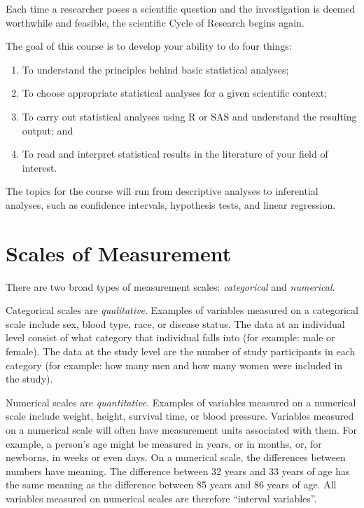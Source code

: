 \documentclass[
]{book}
\providecommand{\tightlist}{%
  \setlength{\itemsep}{0pt}\setlength{\parskip}{0pt}}
\begin{document}
Each time a researcher poses a scientific question and the investigation is deemed worthwhile and feasible, the scientific Cycle of Research begins again.

The goal of this course is to develop your ability to do four things:

\begin{enumerate}
\def\labelenumi{\arabic{enumi}.}
\tightlist
\item
  To understand the principles behind basic statistical analyses;
\item
  To choose appropriate statistical analyses for a given scientific context;
\item
  To carry out statistical analyses using R or SAS and understand the resulting output; and
\item
  To read and interpret statistical results in the literature of your field of interest.
\end{enumerate}

The topics for the course will run from descriptive analyses to inferential analyses, such as confidence intervals, hypothesis tests, and linear regression.

\hypertarget{scales-of-measurement}{%
\section{Scales of Measurement}\label{scales-of-measurement}}

There are two broad types of measurement scales: \emph{categorical} and \emph{numerical}.

Categorical scales are \emph{qualitative}. Examples of variables measured on a categorical scale include sex, blood type, race, or disease status. The data at an individual level consist of what category that individual falls into (for example: male or female). The data at the study level are the number of study participants in each category (for example: how many men and how many women were included in the study).

Numerical scales are \emph{quantitative}. Examples of variables measured on a numerical scale include weight, height, survival time, or blood pressure. Variables measured on a numerical scale will often have measurement units associated with them. For example, a person's age might be measured in years, or in months, or, for newborns, in weeks or even days. On a numerical scale, the differences between numbers have meaning. The difference between 32 years and 33 years of age has the same meaning as the difference between 85 years and 86 years of age. All variables measured on numerical scales are therefore ``interval variables''.
\end{document}
